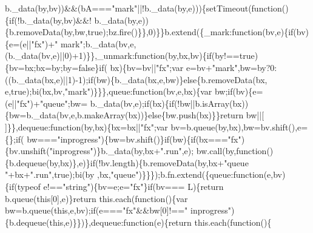 \begin{DoxyCode}
      b.\_data(by,bv))&&(bA===\textcolor{stringliteral}{"mark"}||!b.\_data(by,e)))\{setTimeout(\textcolor{keyword}{function}()\{\textcolor{keywordflow}{if}(!b.\_data(by,bv)&&!
      b.\_data(by,e))\{b.removeData(by,bw,\textcolor{keyword}{true});bz.fire()\}\},0)\}\}b.extend(\{\_mark:function(bv,e)\{if(bv)\{e=(e||\textcolor{stringliteral}{"fx"})+\textcolor{stringliteral}{"
      mark"};b.\_data(bv,e,(b.\_data(bv,e)||0)+1)\}\},\_unmark:\textcolor{keyword}{function}(by,bx,bv)\{if(by!==true)\{bv=bx;bx=by;by=false\}\textcolor{keywordflow}{if}(
      bx)\{bv=bv||\textcolor{stringliteral}{"fx"};var e=bv+\textcolor{stringliteral}{"mark"},bw=by?0:((b.\_data(bx,e)||1)-1);if(bw)\{b.\_data(bx,e,bw)\}\textcolor{keywordflow}{else}\{b.removeData(bx,
      e,true);bi(bx,bv,\textcolor{stringliteral}{"mark"})\}\}\},queue:\textcolor{keyword}{function}(bv,e,bx)\{var bw;\textcolor{keywordflow}{if}(bv)\{e=(e||\textcolor{stringliteral}{"fx"})+\textcolor{stringliteral}{"queue"};bw=
      b.\_data(bv,e);\textcolor{keywordflow}{if}(bx)\{\textcolor{keywordflow}{if}(!bw||b.isArray(bx))\{bw=b.\_data(bv,e,b.makeArray(bx))\}\textcolor{keywordflow}{else}\{bw.push(bx)\}\}\textcolor{keywordflow}{return} bw||[
      ]\}\},dequeue:\textcolor{keyword}{function}(by,bx)\{bx=bx||\textcolor{stringliteral}{"fx"};var bv=b.queue(by,bx),bw=bv.shift(),e=\{\};\textcolor{keywordflow}{if}(
      bw===\textcolor{stringliteral}{"inprogress"})\{bw=bv.shift()\}\textcolor{keywordflow}{if}(bw)\{\textcolor{keywordflow}{if}(bx===\textcolor{stringliteral}{"fx"})\{bv.unshift(\textcolor{stringliteral}{"inprogress"})\}b.\_data(by,bx+\textcolor{stringliteral}{".run"},e);
      bw.call(by,\textcolor{keyword}{function}()\{b.dequeue(by,bx)\},e)\}\textcolor{keywordflow}{if}(!bv.length)\{b.removeData(by,bx+\textcolor{stringliteral}{"queue "}+bx+\textcolor{stringliteral}{".run"},\textcolor{keyword}{true});bi(by
      ,bx,\textcolor{stringliteral}{"queue"})\}\}\});b.fn.extend(\{queue:\textcolor{keyword}{function}(e,bv)\{\textcolor{keywordflow}{if}(typeof e!==\textcolor{stringliteral}{"string"})\{bv=e;e=\textcolor{stringliteral}{"fx"}\}\textcolor{keywordflow}{if}(bv===
      L)\{\textcolor{keywordflow}{return} b.queue(\textcolor{keyword}{this}[0],e)\}\textcolor{keywordflow}{return} this.each(\textcolor{keyword}{function}()\{var bw=b.queue(\textcolor{keyword}{this},e,bv);\textcolor{keywordflow}{if}(e===\textcolor{stringliteral}{"fx"}&&bw[0]!==\textcolor{stringliteral}{"
      inprogress"})\{b.dequeue(\textcolor{keyword}{this},e)\}\})\},dequeue:\textcolor{keyword}{function}(e)\{\textcolor{keywordflow}{return} this.each(\textcolor{keyword}{function}()\{

\end{DoxyCode}
